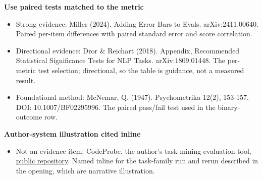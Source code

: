 \textbf{Use paired tests matched to the metric}

\begin{itemize}
\tightlist
\item
  Strong evidence: Miller (2024). Adding Error Bars to Evals. arXiv:2411.00640. Paired per-item differences with paired standard error and score correlation.
\item
  Directional evidence: Dror \& Reichart (2018). Appendix, Recommended Statistical Significance Tests for NLP Tasks. arXiv:1809.01448. The per-metric test selection; directional, so the table is guidance, not a measured result.
\item
  Foundational method: McNemar, Q. (1947). Psychometrika 12(2), 153-157. DOI: 10.1007/BF02295996. The paired pass/fail test used in the binary-outcome row.
\end{itemize}

\textbf{Author-system illustration cited inline}

\begin{itemize}
\tightlist
\item
  Not an evidence item: CodeProbe, the author's task-mining evaluation tool, \href{https://github.com/sjarmak/codeprobe}{public repository}. Named inline for the task-family run and rerun described in the opening, which are narrative illustration.
\end{itemize}
